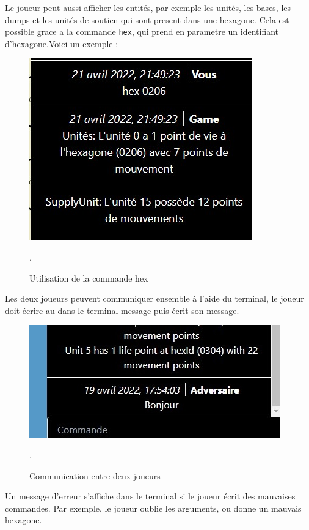 Le joueur peut aussi afficher les entités, par exemple les unités, les bases, les dumps et les unités de soutien qui sont present dans une hexagone.
Cela est possible grace a la commande {\tt hex}, qui prend en parametre un identifiant d'hexagone.Voici un exemple :\\

\begin{figure}[H]
    \centering
    \includegraphics[scale=0.75]{data/hex_command.jpg}
    \caption{Utilisation de la commande hex}.
\end{figure}

Les deux joueurs peuvent communiquer ensemble  à l'aide du terminal, le joueur doit écrire au dans le terminal \og message \fg{} puis écrit son message.\\
\begin{figure}[H]
    \centering
    \includegraphics[scale=0.6]{data/chat.jpg}
    \caption{Communication entre deux joueurs}.
\end{figure}

Un message d'erreur s'affiche dans le terminal si le joueur écrit  des mauvaises commandes.
Par exemple, le joueur oublie les arguments, ou donne un mauvais hexagone.\\

